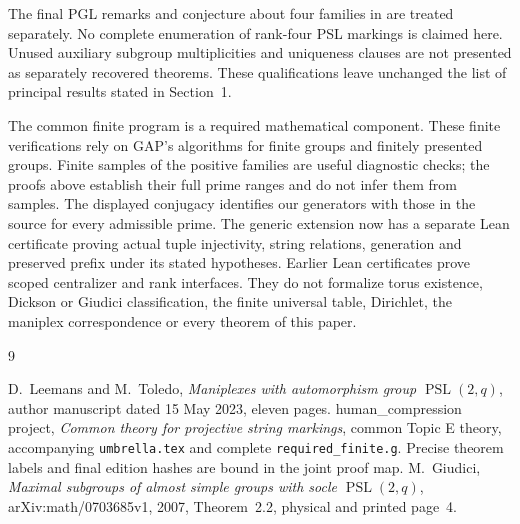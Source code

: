 \documentclass[11pt]{article}
\begin{document}
The final PGL remarks and conjecture about four families in \cite[Section~5]{LT}
are treated separately. No complete enumeration of rank-four PSL
markings is claimed here. Unused auxiliary subgroup multiplicities and
uniqueness clauses are not presented as separately recovered theorems.
These qualifications leave unchanged the list of principal results
stated in Section~1.

The common finite program is a required mathematical component. These
finite verifications rely on GAP's algorithms for finite groups and
finitely presented groups. Finite samples of the positive families
are useful diagnostic checks; the proofs above establish their full
prime ranges and do not infer them from samples. The displayed conjugacy identifies our generators with those in the
source for every admissible prime.
The generic extension now has a separate Lean certificate proving
actual tuple injectivity, string relations, generation and preserved
prefix under its stated hypotheses. Earlier Lean certificates prove
scoped centralizer and rank interfaces. They do not formalize torus
existence, Dickson or Giudici classification, the finite universal table,
Dirichlet, the maniplex correspondence or every theorem of this paper.

\begin{thebibliography}{9}
\raggedright
{} D.~Leemans and M.~Toledo,
\emph{Maniplexes with automorphism group $\operatorname{PSL}(2,q)$},
author manuscript dated 15 May 2023, eleven pages.
 human\_compression project,
\emph{Common theory for projective string markings},
common Topic E theory, accompanying \texttt{umbrella.tex} and complete
\texttt{required\_finite.g}. Precise theorem labels and final edition
hashes are bound in the joint proof map.
 M.~Giudici,
\emph{Maximal subgroups of almost simple groups with socle
$\operatorname{PSL}(2,q)$}, arXiv:math/0703685v1, 2007,
Theorem~2.2, physical and printed page~4.
\end{thebibliography}
\end{document}
